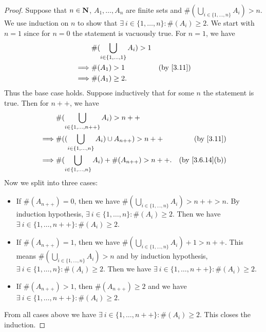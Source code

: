 \begin{proof}
  Suppose that \(n \in \mathbf{N}\), \(A_1, \dots, A_n\) are finite sets and \(\#(\bigcup_{i \in \{1, \dots, n\}} A_i) > n\).
  We use induction on \(n\) to show that \(\exists\ i \in \{1, \dots, n\} : \#(A_i) \geq 2\).
  We start with \(n = 1\) since for \(n = 0\) the statement is vacuously true.
  For \(n = 1\), we have
  \begin{align*}
             & \#(\bigcup_{i \in \{1, \dots, 1\}} A_i) > 1                           \\
    \implies & \#(A_1) > 1                                 & \text{(by \cref{3.11})} \\
    \implies & \#(A_1) \geq 2.
  \end{align*}
  Thus the base case holds.
  Suppose inductively that for some \(n\) the statement is true.
  Then for \(n++\), we have
  \begin{align*}
             & \#(\bigcup_{i \in \{1, \dots, n++\}} A_i) > n++                                             \\
    \implies & \#((\bigcup_{i \in \{1, \dots, n\}} A_i) \cup A_{n++}) > n++ & \text{(by \cref{3.11})}      \\
    \implies & \#(\bigcup_{i \in \{1, \dots, n\}} A_i) + \#(A_{n++}) > n++. & \text{(by \cref{3.6.14}(b))}
  \end{align*}
  Now we split into three cases:
  \begin{itemize}
    \item If \(\#(A_{n++}) = 0\), then we have \(\#(\bigcup_{i \in \{1, \dots, n\}} A_i) > n++ > n\).
          By induction hypothesis, \(\exists\ i \in \{1, \dots, n\} : \#(A_i) \geq 2\).
          Then we have \(\exists\ i \in \{1, \dots, n++\} : \#(A_i) \geq 2\).
    \item If \(\#(A_{n++}) = 1\), then we have \(\#(\bigcup_{i \in \{1, \dots, n\}} A_i) + 1 > n++\).
          This means \(\#(\bigcup_{i \in \{1, \dots, n\}} A_i) > n\) and by induction hypothesis, \(\exists\ i \in \{1, \dots, n\} : \#(A_i) \geq 2\).
          Then we have \(\exists\ i \in \{1, \dots, n++\} : \#(A_i) \geq 2\).
    \item If \(\#(A_{n++}) > 1\), then \(\#(A_{n++}) \geq 2\) and we have \(\exists\ i \in \{1, \dots, n++\} : \#(A_i) \geq 2\).
  \end{itemize}
  From all cases above we have \(\exists\ i \in \{1, \dots, n++\} : \#(A_i) \geq 2\).
  This closes the induction.
\end{proof}